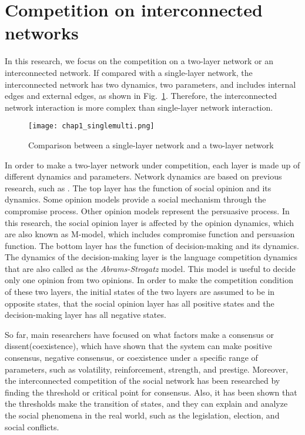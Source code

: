 \section{Competition on interconnected networks}
In this research, we focus on the competition on a two-layer network or an interconnected network. If compared with a single-layer network, the interconnected network has two dynamics, two parameters, and includes internal edges and external edges, as shown in Fig.~\ref{chap1_singlemulti}. Therefore, the interconnected network interaction is more complex than single-layer network interaction.

\begin{figure}[!htb]
	\centering
	\texttt{[image: chap1\_singlemulti.png]}
	\caption{Comparison between a single-layer network and a two-layer network}
	\label{chap1_singlemulti}
\end{figure}

In order to make a two-layer network under competition, each layer is made up of different dynamics and parameters. Network dynamics are based on previous research, such as \parencite{alvarez2016}. The top layer has the function of social opinion and its dynamics. Some opinion models provide a social mechanism through the compromise process.\parencite{naim2003} Other opinion models represent the persuasive process.\parencite{chau2014} In this research, the social opinion layer is affected by the opinion dynamics, which are also known as M-model\parencite{rocca2014}, which includes compromise function and persuasion function. The bottom layer has the function of decision-making and its dynamics. The dynamics of the decision-making layer is the language competition dynamics that are also called as the \textit{Abrams-Strogatz} model\parencite{abrams2003, vazquez2010, patriarca2012}. This model is useful to decide only one opinion from two opinions. In order to make the competition condition of these two layers, the initial states of the two layers are assumed to be in opposite states, that the social opinion layer has all positive states and the decision-making layer has all negative states.

So far, main researchers have focused on what factors make a consensus or dissent(coexistence), which have shown that the system can make positive consensus, negative consensus, or coexistence under a specific range of parameters, such as volatility, reinforcement, strength, and prestige.\parencite{alvarez2016} Moreover, the interconnected competition of the social network has been researched by finding the threshold or critical point for consensus.\parencite{alvarez2016, gomez2015, diep2017} Also, it has been shown that the thresholds make the transition of states, and they can explain and analyze the social phenomena in the real world, such as the legislation, election, and social conflicts.\parencite{alvarez2016, amato2017, diep2017}

